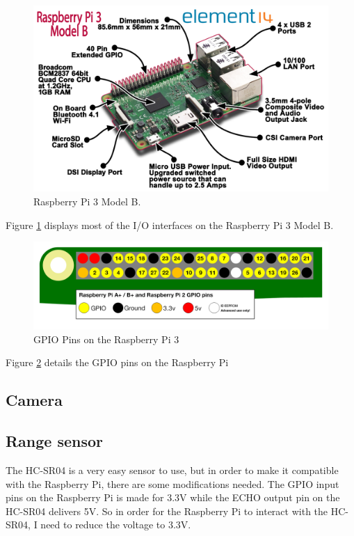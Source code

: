 \begin{figure}[H]
  \centering
  \includegraphics[width=1\textwidth]{fig/pi3}
  \caption{Raspberry Pi 3 Model B. \cite{pi3}}
  \label{fig:pi3}
\end{figure}

Figure \ref{fig:pi3} displays most of the I/O interfaces on the Raspberry Pi 3 Model B.

\begin{figure}[H]
  \centering
  \includegraphics[width=1\textwidth]{fig/gpio}
  \caption{GPIO Pins on the Raspberry Pi 3\cite{rpi}}
  \label{fig:gpio}
\end{figure}

Figure \ref{fig:gpio} details the GPIO pins on the Raspberry Pi 

\subsection{Camera}
\subsection{Range sensor}
The HC-SR04 is a very easy sensor to use, but in order to make it compatible with the Raspberry Pi, there are some modifications needed. The GPIO input pins on the Raspberry Pi is made for 3.3V while the ECHO output pin on the HC-SR04 delivers 5V. So in order for the Raspberry Pi to interact with the HC-SR04, I need to reduce the voltage to 3.3V.\\

